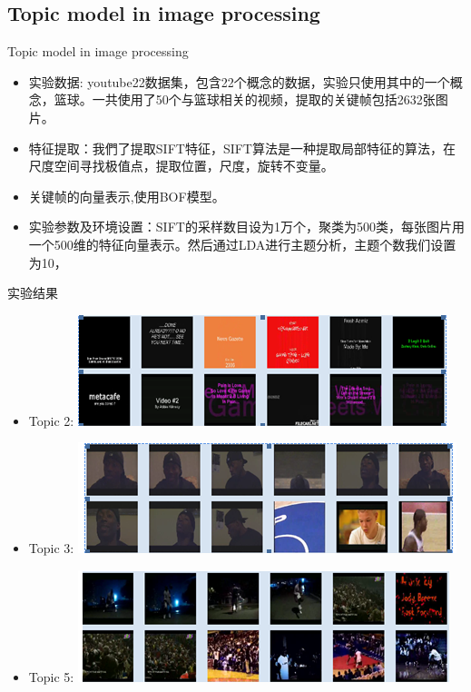 \documentclass[hyperref={unicode}]{beamer}
\begin{document}
\begin{CJK}{UTF8}{gkai}
\subsection{Topic model in image processing}
\begin{frame}{Topic model in image processing}
  \begin{itemize}
  \item 实验数据: youtube22数据集，包含22个概念的数据，实验只使用其中的一个概念，篮球。一共使用了50个与篮球相关的视频，提取的关键帧包括2632张图片。
  \item 特征提取：我們了提取\alert{SIFT}特征，SIFT算法是一种提取局部特征的算法，在尺度空间寻找极值点，提取位置，尺度，旋转不变量。
  \item 关键帧的向量表示,使用BOF模型。
  \item 实验参数及环境设置：SIFT的采样数目设为1万个，聚类为500类，每张图片用一个500维的特征向量表示。然后通过LDA进行主题分析，主题个数我们设置为10，
\end{itemize}

\end{frame}
\begin{frame}{实验结果}
  \begin{itemize}
  \item Topic 2:   \includegraphics[scale=0.6]{topic2}
  \item Topic 3:   \includegraphics[scale=0.6]{topic3}
  \item Topic 5:   \includegraphics[scale=0.6]{topic5}
  \end{itemize}


\end{frame}
\end{CJK}
\end{document}
